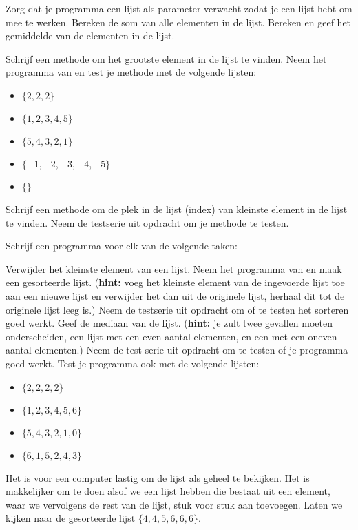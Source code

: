 \opdracht[2] \label{mean}%
\? Zorg dat je programma een lijst als parameter verwacht zodat je een lijst hebt om mee te werken.\label{ingelezenlijst}
\? Bereken de som van alle elementen in de lijst.
\? Bereken en geef het gemiddelde van de elementen in de lijst.

\opdracht[2] \label{max}%
\? Schrijf een methode om het grootste element in de lijst te vinden.
\? Neem het programma van  en test je methode met de volgende lijsten:\label{testserie}
	\begin{itemize}
		\item $\{2, 2, 2\}$
		\item $\{1, 2, 3, 4, 5\}$
		\item $\{5, 4, 3, 2, 1\}$
		\item $\{-1, -2, -3, -4, -5\}$
		\item $\{\}$
	\end{itemize}

\opdracht[2] 
\? Schrijf een methode om de plek in de lijst (index) van kleinste element in de lijst te vinden.
\? Neem de testserie uit opdracht  om je methode te testen.

\opdracht[3] Schrijf een programma voor elk van de volgende taken:\label{median}%

\? Verwijder het kleinste element van een lijst.
\? Neem het programma van  en maak een gesorteerde lijst. (\textbf{hint:} voeg het kleinste element van de ingevoerde lijst toe aan een nieuwe lijst en verwijder het dan uit de originele lijst, herhaal dit tot de originele lijst leeg is.)\label{gesorteerdelijst}
\? Neem de testserie uit opdracht  om of te testen het sorteren goed werkt.
\? Geef de mediaan van de lijst. (\textbf{hint:} je zult twee gevallen moeten onderscheiden, een lijst met een even aantal elementen, en een met een oneven aantal elementen.)
\? Neem de test serie uit opdracht  om te testen of je programma goed werkt.
\? Test je programma ook met de volgende lijsten:
	\begin{itemize}
		\item $\{2, 2, 2, 2\}$
		\item $\{1, 2, 3, 4, 5, 6\}$
		\item $\{5, 4, 3, 2, 1, 0\}$
		\item $\{6, 1, 5, 2, 4, 3\}$
	\end{itemize}

\opdracht[3] \label{mode}%
Het is voor een computer lastig om de lijst als geheel te bekijken. Het is makkelijker om te doen alsof we een lijst hebben die bestaat uit een element, waar we vervolgens de rest van de lijst, stuk voor stuk aan toevoegen. Laten we kijken naar de gesorteerde lijst $\{4, 4, 5, 6, 6, 6\}$.

